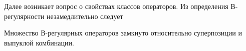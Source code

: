 Далее возникает вопрос о свойствах классов операторов.
Из определения В-регулярности незамедлительно следует

\begin{lemma}
	\label{lem:B-regular_superposition_and_addition}
	Множество В-регулярных операторов замкнуто относительно суперпозиции и выпуклой комбинации.
\end{lemma}


%
%

